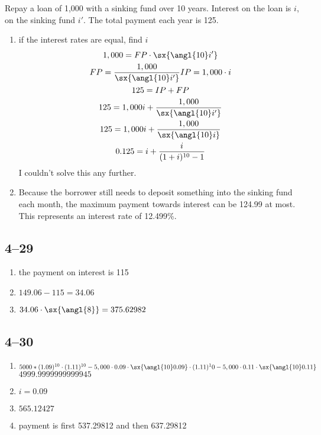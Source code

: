 \documentclass[a4paper, 12pt, reqno]{amsart}
\numberwithin{equation}{section}
\begin{document}
Repay a loan of 1,000 with a sinking fund over 10 years. Interest on the loan
is $i$, on the sinking fund $i'$. The total payment each year is 125.
\begin{enumerate}[label=(alph*)]
    \item if the interest rates are equal, find $i$
        \begin{equation}\nonumber
            \begin{gathered}
                1,000 = FP \cdot \sx{\angl{10}i'} \\
                FP = \frac{1,000}{\sx{\angl{10}i'}}
                IP = 1,000 \cdot i              \\
                125 = IP + FP                   \\
                125 = 1,000i + \frac{1,000}{\sx{\angl{10}i'}}       \\
                125 = 1,000i + \frac{1,000}{\sx{\angl{10}i}}        \\
                0.125 = i + \frac{i}{(1+i)^{10}-1}                  \\
            \end{gathered}
        \end{equation}
        I couldn't solve this any further.
    \item Because the borrower still needs to deposit something into the
        sinking fund each month, the maximum payment towards interest can be
        124.99 at most. This represents an interest rate of 12.499\%.
\end{enumerate}

\subsection*{4--29}

\begin{enumerate}[label=(alph*)]
    \item the payment on interest is 115
    \item $149.06 - 115 = 34.06$
    \item $34.06 \cdot \sx{\angl{8}} = 375.62982$
\end{enumerate}

\subsection*{4--30}

\begin{enumerate}[label=(alph*)]
    \item $5000*(1.09)^{10} \cdot (1.11)^{10} - 5,000 \cdot 0.09
        \cdot \sx{\angl{10}0.09} \cdot (1.11)^10 - 5,000 \cdot 0.11
        \cdot \sx{\angl{10}0.11}$ \\ $4999.9999999999945$
    \item $i=0.09$
    \item $565.12427$
    \item payment is first 537.29812 and then 637.29812
\end{enumerate}
\end{document}
